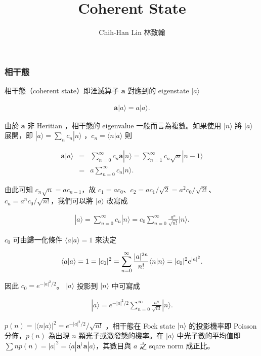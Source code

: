 \documentclass[12pt]{beamer}
\title{Coherent State }
\author{Chih-Han Lin 林致翰}
\institute{clin@ltl.iams.sinica.edu.tw}
\newcommand{\bra}[1]{\langle#1|}
\newcommand{\ket}[1]{|#1\rangle }
\newcommand{\braket}[2]{\langle#1|#2\rangle }
\begin{document}
\begin{frame}
\titlepage
\end{frame}

\begin{frame}
\frametitle{相干態}
相干態（coherent state）即湮滅算子 $ \bm{a} $ 對應到的 eigenstate $ \ket{a} $ 

\begin{eqnarray}
\bm{a}\ket{a}=a\ket{a}.
\end{eqnarray}

由於 $ \bm{a} $ 非 Heritian ，相干態的 eigenvalue 一般而言為複數。如果使用 $ \ket{n} $ 將 $ \ket{a} $ 展開，即 $ \ket{a}=\sum_n c_n\ket{n} $ ，$ c_n=\braket{n}{a} $ 則

\begin{eqnarray}
\bm{a}\ket{a}&=&\sum_{n=0}^\infty c_n\bm{a}\ket{n}=\sum_{n=1}^\infty c_n\sqrt{n}\ket{n-1}\\&=&a\sum_{n=0}^\infty c_n\ket{n}.
\end{eqnarray}


\end{frame}

\begin{frame}
由此可知 $  c_n\sqrt{n}=ac_{n-1} $，故 $ c_1=ac_0 $、$ c_2=ac_1/\sqrt{2}=a^2c_0/\sqrt{2!} $、$ c_n=a^nc_0/\sqrt{n!} $，我們可以將 $ \ket{a} $ 改寫成

\begin{eqnarray}
\ket{a}=\sum_{n=0}^\infty c_n\ket{n}=c_0\sum_{n=0}^\infty\frac{a^n}{\sqrt{n!}}\ket{n}.
\end{eqnarray}

$ c_0 $ 可由歸一化條件 $ \braket{a}{a}=1 $ 來決定

\begin{eqnarray}
\protect\braket{a}{a}=1=|c_0|^2=\sum_{n=0}^\infty\frac{|a|^{2n}}{n!}\braket{n}{n}=|c_0|^2e^{|a|^2}.
\end{eqnarray}
\end{frame}


\begin{frame}
因此 $ c_0 =e^{-|a|^2/2} $。 $ \ket{a} $ 投影到 $ \ket{n} $ 中可寫成

\begin{eqnarray}\label{coherent}
\ket{a}=e^{-|a|^2/2}\sum_{n=0}^\infty\frac{a^n}{\sqrt{n!}}\ket{n}.
\end{eqnarray} 

$ p(n)=|\braket{n}{a}|^2=e^{-|a|^2/2}/\sqrt{n!} $ ，相干態在 Fock state $ \ket{n} $ 的投影機率即 Poisson 分佈，$ p(n) $ 為出現 $ n $ 顆光子或激發態的機率。在 $ \ket{a} $ 中光子數的平均值即 $ \sum np(n)=|a|^2=\bra{a}\bm{a}^\dag\bm{a}\ket{a} $，其數目與 $ a $ 之 sqare norm 成正比。
\end{frame}
\end{document}
